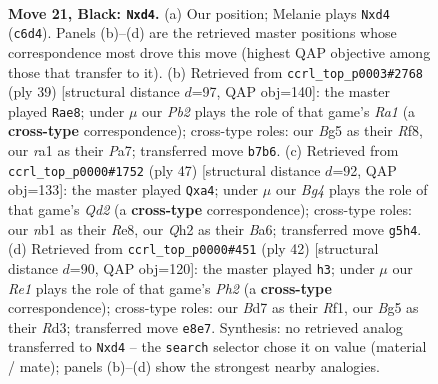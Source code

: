 \documentclass[11pt]{article}
\begin{document}
\clearpage

\begin{figure}[p]\centering
\begin{subfigure}{0.46\textwidth}\centering
\resizebox{\linewidth}{!}{%
\newchessgame
\chessboard[
  setfen={r3r3/1ppb1pkp/2n5/p2p2b1/3P2P1/NP2P3/P2B1P1q/RN1QRK2 b - - 6 21},
  showmover=false,
  pgfstyle=straightmove, color=movearrow, markmove={c6-d4}
]}
\caption{}
\end{subfigure}\hfill
\begin{subfigure}{0.46\textwidth}\centering
\resizebox{\linewidth}{!}{%
\newchessgame
\chessboard[
  setfen={r4rk1/pp4np/2pb3q/3p4/Bn1P1P2/8/PPPKNB1P/4RQ1R b - - 7 20},
  showmover=false,
  pgfstyle=straightmove, color=movearrow, markmove={a8-e8}
]}
\caption{}
\end{subfigure}
\\[4pt]
\begin{subfigure}{0.46\textwidth}\centering
\resizebox{\linewidth}{!}{%
\newchessgame
\chessboard[
  setfen={1r2r1k1/2pq1pp1/b4b1p/B2Pn3/P1P1B2P/6P1/2R1QP1N/3R2K1 b - - 0 24},
  showmover=false,
  pgfstyle=straightmove, color=movearrow, markmove={d7-a4}
]}
\caption{}
\end{subfigure}\hfill
\begin{subfigure}{0.46\textwidth}\centering
\resizebox{\linewidth}{!}{%
\newchessgame
\chessboard[
  setfen={3rnrk1/4qp1p/p1bp2p1/1p6/4PQB1/P1NR4/1PP3PP/5R1K w - - 3 22},
  showmover=false,
  pgfstyle=straightmove, color=movearrow, markmove={h2-h3}
]}
\caption{}
\end{subfigure}
\caption{\textbf{Move 21, Black: \texttt{Nxd4}.} (a) Our position; Melanie plays \texttt{Nxd4} (\texttt{c6d4}). Panels (b)--(d) are the retrieved master positions whose correspondence most drove this move (highest QAP objective among those that transfer to it). (b) Retrieved from \texttt{ccrl\_top\_p0003\#2768} (ply 39) [structural distance $d$=97, QAP obj=140]: the master played \texttt{Rae8}; under $\mu$ our \emph{Pb2} plays the role of that game's \emph{Ra1} (a \textbf{cross-type} correspondence); cross-type roles: our \emph{B}g5 as their \emph{R}f8, our \emph{r}a1 as their \emph{P}a7; transferred move \texttt{b7b6}. (c) Retrieved from \texttt{ccrl\_top\_p0000\#1752} (ply 47) [structural distance $d$=92, QAP obj=133]: the master played \texttt{Qxa4}; under $\mu$ our \emph{Bg4} plays the role of that game's \emph{Qd2} (a \textbf{cross-type} correspondence); cross-type roles: our \emph{n}b1 as their \emph{R}e8, our \emph{Q}h2 as their \emph{B}a6; transferred move \texttt{g5h4}. (d) Retrieved from \texttt{ccrl\_top\_p0000\#451} (ply 42) [structural distance $d$=90, QAP obj=120]: the master played \texttt{h3}; under $\mu$ our \emph{Re1} plays the role of that game's \emph{Ph2} (a \textbf{cross-type} correspondence); cross-type roles: our \emph{B}d7 as their \emph{R}f1, our \emph{B}g5 as their \emph{R}d3; transferred move \texttt{e8e7}. Synthesis: no retrieved analog transferred to \texttt{Nxd4} -- the \texttt{search} selector chose it on value (material / mate); panels (b)--(d) show the strongest nearby analogies.}
\label{fig:thought-m41}
\end{figure}
\end{document}
